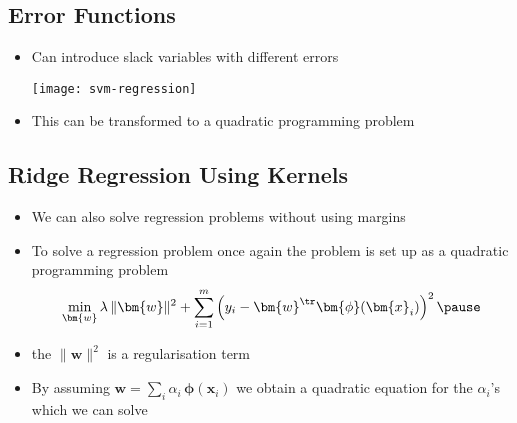 \begin{slide}
\section{Error Functions}

\begin{PauseHighLight}
  \begin{itemize}
  \item Can introduce slack variables with different errors
    \begin{center}
      \texttt{[image: svm-regression]}
    \end{center}
  \item This can be transformed to a quadratic programming problem
  \end{itemize}
\end{PauseHighLight}

\end{slide}

\begin{slide}


\section{Ridge Regression Using Kernels}

\begin{PauseHighLight}
  \begin{itemize}
  \item We can also solve regression problems without using margins\pause
  \item To solve a regression problem once again the problem is set up
    as a quadratic programming problem
    \begin{align*}
      \min_{\bm{w}} \lambda\,\| \bm{w} \|^2 + \sum_{i=1}^m \left( y_i -
      \bm{w}^\tr \bm{\phi}(\bm{x}_i) \right)^2\pause
    \end{align*}
  \item the $\| \bm{w} \|^2$ is a regularisation term\pause
  \item By assuming $\bm{w} = \sum_i \alpha_i \,\bm{\phi}(\bm{x}_i)$ we
    obtain a quadratic equation for the $\alpha_i$'s which we can
    solve\pause
  \end{itemize}
\end{PauseHighLight}

\end{slide}

